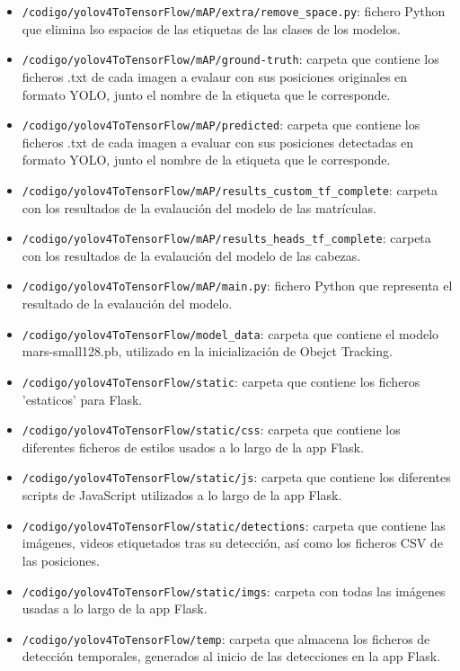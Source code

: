 \begin{itemize}
    \item \texttt{/codigo/yolov4ToTensorFlow/mAP/extra/remove\_space.py}: fichero Python que elimina lso espacios de las etiquetas de las clases de los modelos.
    \item \texttt{/codigo/yolov4ToTensorFlow/mAP/ground-truth}: carpeta que contiene los ficheros .txt de cada imagen a evalaur con sus posiciones originales en formato YOLO, junto el nombre de la etiqueta que le corresponde.
    \item \texttt{/codigo/yolov4ToTensorFlow/mAP/predicted}: carpeta que contiene los ficheros .txt de cada imagen a evaluar con sus posiciones detectadas en formato YOLO, junto el nombre de la etiqueta que le corresponde.
    \item \texttt{/codigo/yolov4ToTensorFlow/mAP/results\_custom\_tf\_complete}: carpeta con los resultados de la evalaución del modelo de las matrículas.
    \item \texttt{/codigo/yolov4ToTensorFlow/mAP/results\_heads\_tf\_complete}: carpeta con los resultados de la evalaución del modelo de las cabezas.
    \item \texttt{/codigo/yolov4ToTensorFlow/mAP/main.py}: fichero Python que representa el resultado de la evalaución del modelo.
    \item \texttt{/codigo/yolov4ToTensorFlow/model\_data}: carpeta que contiene el modelo mars-small128.pb, utilizado en la inicialización de Obejct Tracking.
    \item \texttt{/codigo/yolov4ToTensorFlow/static}: carpeta que contiene los ficheros 'estaticos' para Flask.
    \item \texttt{/codigo/yolov4ToTensorFlow/static/css}: carpeta que contiene los diferentes ficheros de estilos\cite{css} usados a lo largo de la app Flask.
    \item \texttt{/codigo/yolov4ToTensorFlow/static/js}: carpeta que contiene los diferentes scripts de JavaScript\cite{js} utilizados a lo largo de la app Flask.
    \item \texttt{/codigo/yolov4ToTensorFlow/static/detections}: carpeta que contiene las imágenes, videos etiquetados tras su detección, así como los ficheros CSV de las posiciones.
    \item \texttt{/codigo/yolov4ToTensorFlow/static/imgs}: carpeta con todas las imágenes usadas a lo largo de la app Flask.
    \item \texttt{/codigo/yolov4ToTensorFlow/temp}: carpeta que almacena los ficheros de detección temporales, generados al inicio de las detecciones en la app Flask.

\end{itemize}
